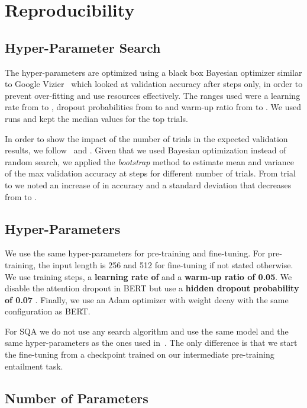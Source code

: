 \documentclass[11pt,a4paper]{article}
\newcommand{\sqa}{\textsc{SQA}\xspace}
\newcommand{\bert}{\textsc{BERT}\xspace}
\theoremstyle{definition}
\begin{document}
\section{Reproducibility}
\label{sec:apx-repro}

\subsection{Hyper-Parameter Search}

The hyper-parameters are optimized using a black box Bayesian optimizer similar to Google Vizier~\cite{vizier} which looked at validation accuracy after  steps only, in order to prevent over-fitting and use resources effectively. 
The ranges used were a learning rate from  to , dropout probabilities from  to  and warm-up ratio from  to . We used  runs and kept the median values for the top  trials.

In order to show the impact of the number of trials in the expected validation results, we follow~\citet{AAAI1816669} and \citet{dodge-19}. Given that we used Bayesian optimization instead of random search, we applied the \emph{bootstrap} method to estimate mean and variance of the max validation accuracy at  steps for different number of trials. From trial  to  we noted an increase  of  in accuracy and a standard deviation that decreases from  to .

\subsection{Hyper-Parameters}

We use the same hyper-parameters for pre-training and fine-tuning.
For pre-training, the input length is 256 and 512 for fine-tuning if not stated otherwise.
We use  training steps, a \textbf{learning rate of } and a \textbf{warm-up ratio of 0.05}.
We disable the attention dropout in \bert{} but use a \textbf{hidden dropout probability of 0.07 }.
Finally, we use an Adam optimizer with weight decay with the same configuration as \bert{}.

For \sqa we do not use any search algorithm and use the same model and the same hyper-parameters as the ones used in~\citet{herzig-2020}.
The only difference is that we start the fine-tuning from a checkpoint trained on our intermediate pre-training entailment task.

\subsection{Number of Parameters}
\end{document}
